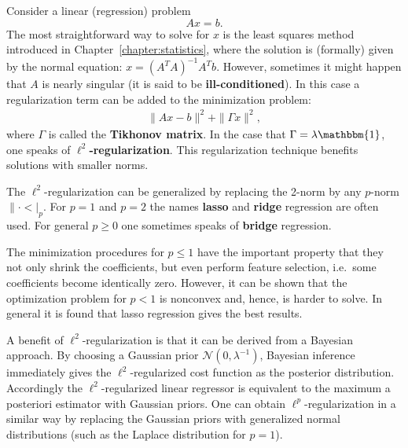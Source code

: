     \begin{method}{
        Consider a linear (regression) problem \[Ax = b.\] The most straightforward way to solve for $x$ is the least squares method introduced in Chapter~\ref{chapter:statistics}, where the solution is (formally) given by the normal equation: $x=(A^TA)^{-1}A^Tb$. However, sometimes it might happen that $A$ is nearly singular (it is said to be \textbf{ill-conditioned}). In this case a regularization term can be added to the minimization problem:
        \begin{gather}
            \|Ax-b\|^2+\|\Gamma x\|^2,
        \end{gather}
        where $\Gamma$ is called the \textbf{Tikhonov matrix}. In the case that $\Gamma=\lambda\mathbbm{1}$, one speaks of \textbf{$\ell^2$-regularization}. This regularization technique benefits solutions with smaller norms.
    }
    \end{method}
    \begin{remark}
        The $\ell^2$-regularization can be generalized by replacing the 2-norm by any $p$-norm $\|\cdot<|_p$. For $p=1$ and $p=2$ the names \textbf{lasso} and \textbf{ridge} regression are often used. For general $p\geq0$ one sometimes speaks of \textbf{bridge} regression.

        The minimization procedures for $p\leq1$ have the important property that they not only shrink the coefficients, but even perform feature selection, i.e.~some coefficients become identically zero. However, it can be shown that the optimization problem for $p<1$ is nonconvex and, hence, is harder to solve. In general it is found that lasso regression gives the best results.

        A benefit of $\ell^2$-regularization is that it can be derived from a Bayesian approach. By choosing a Gaussian prior $\mathcal{N}(0,\lambda^{-1})$, Bayesian inference immediately gives the $\ell^2$-regularized cost function as the posterior distribution. Accordingly the $\ell^2$-regularized linear regressor is equivalent to the maximum a posteriori estimator with Gaussian priors. One can obtain $\ell^p$-regularization in a similar way by replacing the Gaussian priors with generalized normal distributions (such as the Laplace distribution for $p=1$).
    \end{remark}

